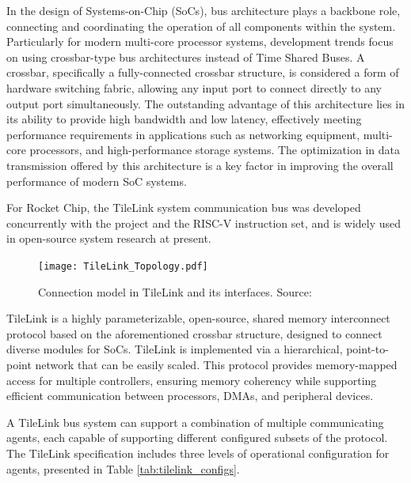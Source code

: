 In the design of Systems-on-Chip (SoCs), bus architecture plays a backbone role, connecting and coordinating the operation of all components within the system. Particularly for modern multi-core processor systems, development trends focus on using crossbar-type bus architectures instead of Time Shared Buses. A crossbar, specifically a fully-connected crossbar structure, is considered a form of hardware switching fabric, allowing any input port to connect directly to any output port simultaneously. The outstanding advantage of this architecture lies in its ability to provide high bandwidth and low latency, effectively meeting performance requirements in applications such as networking equipment, multi-core processors, and high-performance storage systems. The optimization in data transmission offered by this architecture is a key factor in improving the overall performance of modern SoC systems.

For Rocket Chip, the TileLink \cite{sifive2018tilelink} system communication bus was developed concurrently with the project and the RISC-V instruction set, and is widely used in open-source system research at present.

\begin{figure}[h!]
    \centering
    \texttt{[image: TileLink\_Topology.pdf]}
    \caption{Connection model in TileLink and its interfaces. Source: \cite{sifive2018tilelink}}
    \label{fig:tilelink_connection_model}
\end{figure}

TileLink is a highly parameterizable, open-source, shared memory interconnect protocol based on the aforementioned crossbar structure, designed to connect diverse modules for SoCs. TileLink is implemented via a hierarchical, point-to-point network that can be easily scaled. This protocol provides memory-mapped access for multiple controllers, ensuring memory coherency while supporting efficient communication between processors, DMAs, and peripheral devices.

A TileLink bus system can support a combination of multiple communicating agents, each capable of supporting different configured subsets of the protocol. The TileLink specification includes three levels of operational configuration for agents, presented in Table \ref{tab:tilelink_configs}.

